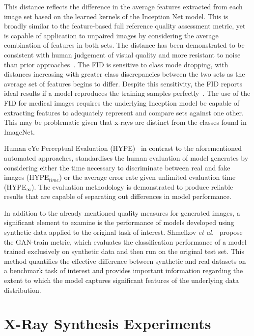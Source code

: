 \documentclass{article}
\begin{document}
This distance reflects the difference in the average features extracted from each image set based on the learned kernels of the Inception Net model. This is broadly similar to the feature-based full reference quality assessment metric, yet is capable of application to unpaired images by considering the average combination of features in both sets. The distance has been demonstrated to be consistent with human judgement of visual quality and more resistant to noise than prior approaches~\cite{heuselGANsTrainedTwo2018,lucicAreGANsCreated2018}. The FID is sensitive to class mode dropping, with distances increasing with greater class discrepancies between the two sets as the average set of features begins to differ. Despite this sensitivity, the FID reports ideal results if a model reproduces the training samples perfectly~\cite{lucicAreGANsCreated2018}. The use of the FID for medical images requires the underlying Inception model be capable of extracting features to adequately represent and compare sets against one other. This may be problematic given that x-rays are distinct from the classes found in ImageNet.

Human eYe Perceptual Evaluation (HYPE)~\cite{zhouHYPEBenchmarkHuman2019} in contrast to the aforementioned automated approaches, standardises the human evaluation of model generates by considering either the time necessary to discriminate between real and fake images (HYPE$_{time}$) or the average error rate given unlimited evaluation time (HYPE$_\infty$). The evaluation methodology is demonstrated to produce reliable results that are capable of separating out differences in model performance.

In addition to the already mentioned quality measures for generated images, a significant element to examine is the performance of models developed using synthetic data applied to the original task of interest. Shmelkov \emph{et al.}~\cite{shmelkovHowGoodMy2018} propose the GAN-train metric, which evaluates the classification performance of a model trained exclusively on synthetic data and then run on the original test set. This method quantifies the effective difference between synthetic and real datasets on a benchmark task of interest and provides important information regarding the extent to which the model captures significant features of the underlying data distribution.

\section{X-Ray Synthesis Experiments}
\end{document}
